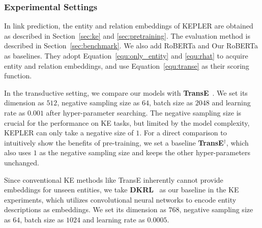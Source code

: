 \subsubsection*{Experimental Settings}
In link prediction, the entity and relation embeddings of KEPLER are obtained as described in Section~\ref{sec:ke} and \ref{sec:pretraining}. The evaluation method is described in Section~\ref{sec:benchmark}.  We also add RoBERTa and Our RoBERTa as baselines. They adopt Equation~\ref{equ:only_entity} and \ref{equ:rhat} to acquire entity and relation embeddings, and use Equation~\ref{equ:transe} as their scoring function.

In the transductive setting, we compare our models with \textbf{TransE}~\citep{bordes2013translating}. We set its dimension as $512$, negative sampling size as $64$, batch size as $2048$ and learning rate as $0.001$ after hyper-parameter searching.  The negative sampling size is crucial for the performance on KE tasks, but limited by the model complexity, KEPLER can only take a negative size of $1$. For a direct comparison to intuitively show the benefits of pre-training, we set a baseline \textbf{TransE$^\dagger$}, which also uses $1$ as the negative sampling size and keeps the other hyper-parameters unchanged.
    
Since conventional KE methods like TransE inherently cannot provide embeddings for unseen entities, we take \textbf{DKRL}~\citep{Xie:2016:RLK:3016100.3016273} as our baseline in the KE experiments, which utilizes convolutional neural networks to encode entity descriptions as embeddings. We set its dimension as $768$, negative sampling size as $64$, batch size as $1024$ and learning rate as $0.0005$. 


